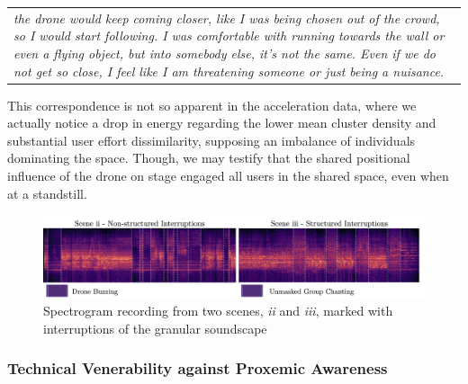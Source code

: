 \begin{center}
\begin{tabular}{ p{13cm}}
\textit{the drone would keep coming closer, like I was being chosen out of the crowd, so I would start following. I was comfortable with running towards the wall or even a flying object, but into somebody else, it's not the same. Even if we do not get so close, I feel like I am threatening someone or just being a nuisance.}
\end{tabular}
\end{center}

This correspondence is not so apparent in the acceleration data, where we actually notice a drop in energy regarding the lower mean cluster density and substantial user effort dissimilarity, supposing an imbalance of individuals dominating the space. Though, we may testify that the shared positional influence of the drone on stage engaged all users in the shared space, even when at a standstill.

\begin{figure}[!ht]
\centering
\includegraphics[width=\textwidth,keepaspectratio]{Chapters/Figures/adse_ess/interuptions-spectogram-markings-fig.png}
{\caption[Spectrogram recording from two scenes, \textit{ii} and \textit{iii}]{Spectrogram recording from two scenes, \textit{ii} and \textit{iii}, marked with interruptions of the granular soundscape}
\label{fig:interuptions-spectogram}}
\end{figure}

\subsubsection{Technical Venerability against Proxemic Awareness}
\label{subsec:accuracy}


